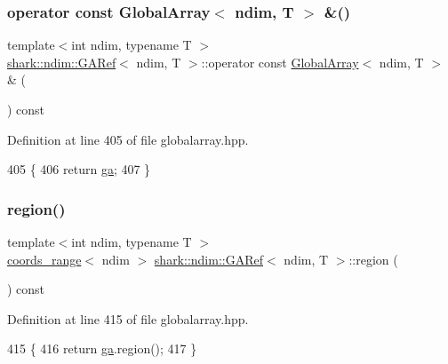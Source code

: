 \subsubsection{\texorpdfstring{operator const Global\+Array$<$ ndim, T $>$ \&()}{operator const GlobalArray< ndim, T > \&()}}
{\footnotesize\ttfamily template$<$int ndim, typename T $>$ \\
\hyperlink{classshark_1_1ndim_1_1_g_a_ref}{shark\+::ndim\+::\+G\+A\+Ref}$<$ ndim, T $>$\+::operator const \hyperlink{classshark_1_1ndim_1_1_global_array}{Global\+Array}$<$ ndim, T $>$ \& (\begin{DoxyParamCaption}{ }\end{DoxyParamCaption}) const\hspace{0.3cm}{\ttfamily [inline]}}



Definition at line 405 of file globalarray.\+hpp.


\begin{DoxyCode}
405                                                                         \{
406             \textcolor{keywordflow}{return} \hyperlink{classshark_1_1ndim_1_1_g_a_ref_ad52c83aede31478298662b70dcc781d7}{ga};
407         \}
\end{DoxyCode}
\hypertarget{classshark_1_1ndim_1_1_g_a_ref_a65c5372c1c28b8f5179d59ecf23304fb}{}\label{classshark_1_1ndim_1_1_g_a_ref_a65c5372c1c28b8f5179d59ecf23304fb} 
\subsubsection{\texorpdfstring{region()}{region()}}
{\footnotesize\ttfamily template$<$int ndim, typename T $>$ \\
\hyperlink{structshark_1_1ndim_1_1coords__range}{coords\+\_\+range}$<$ ndim $>$ \hyperlink{classshark_1_1ndim_1_1_g_a_ref}{shark\+::ndim\+::\+G\+A\+Ref}$<$ ndim, T $>$\+::region (\begin{DoxyParamCaption}{ }\end{DoxyParamCaption}) const\hspace{0.3cm}{\ttfamily [inline]}}



Definition at line 415 of file globalarray.\+hpp.


\begin{DoxyCode}
415                                                               \{
416             \textcolor{keywordflow}{return} \hyperlink{classshark_1_1ndim_1_1_g_a_ref_ad52c83aede31478298662b70dcc781d7}{ga}.region();
417         \}
\end{DoxyCode}


